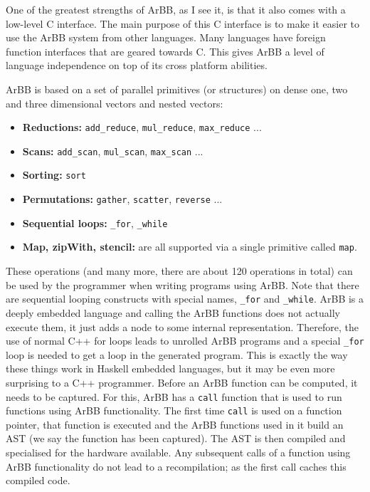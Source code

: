 \documentclass[a4paper]{book}
\begin{document}
One of the greatest strengths of ArBB, as I see it, is that it also comes with a low-level C 
interface. The main purpose of this C interface is to make it easier to use the ArBB system 
from other languages. Many languages have foreign function interfaces that are geared towards C.
This gives ArBB a level of language independence on top of its cross platform abilities.  


ArBB is based on a set of parallel primitives (or structures) on dense one, two and three dimensional vectors and nested vectors: 
\begin{itemize} 
\item {\bf Reductions:}   {\tt add\_reduce}, {\tt mul\_reduce}, {\tt max\_reduce} ... 
\item {\bf Scans:}        {\tt add\_scan}, {\tt mul\_scan}, {\tt max\_scan} ... 
\item {\bf Sorting:}      {\tt sort} 
\item {\bf Permutations:} {\tt gather}, {\tt scatter}, {\tt reverse} ...
\item {\bf Sequential loops:} {\tt \_for}, {\tt \_while} 
\item {\bf Map, zipWith, stencil:} are all supported via a single primitive called {\tt map}.
\end{itemize}

These operations (and many more, there are about 120 operations in total) can be used 
by the programmer when writing programs using ArBB. Note that there are sequential looping 
constructs with special names, {\tt \_for} and {\tt \_while}. ArBB is a deeply embedded 
language and calling the ArBB functions does not actually execute them, it just adds a node to 
some internal representation. Therefore, the use of normal C++ for loops leads to unrolled 
ArBB programs and a special {\tt \_for} loop is needed to get a loop in the generated program. 
This is exactly the way these things work in Haskell embedded languages, but it may be even 
more surprising to a C++ programmer. Before an ArBB function can be computed, it needs to be 
captured. For this, ArBB has a {\tt call} function that is used to run functions using ArBB 
functionality. The first time {\tt call} is used on a function pointer, that function is 
executed and the ArBB functions used in it build an AST (we say the function has been 
captured). The AST is then compiled and specialised for the hardware available. Any 
subsequent calls of a function using ArBB functionality do not lead to a recompilation; 
as the first call caches this compiled code. 
\end{document}
